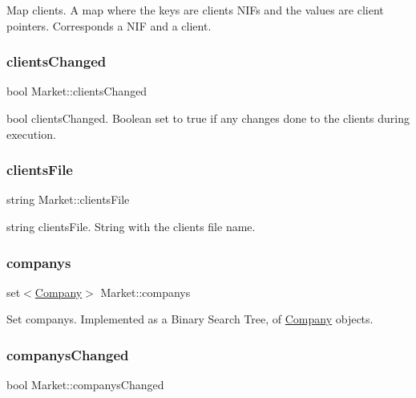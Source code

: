 Map clients. A map where the key\textquotesingle{}s are clients N\+IF\textquotesingle{}s and the values are client pointers. Corresponds a N\+IF and a client. \mbox{\label{class_market_a6028725209e63a9f70a6b59c10d2bfbb}} 
\subsubsection{\texorpdfstring{clients\+Changed}{clientsChanged}}
{\footnotesize\ttfamily bool Market\+::clients\+Changed\hspace{0.3cm}{\ttfamily [private]}}

bool clients\+Changed. Boolean set to true if any changes done to the clients during execution. \mbox{\label{class_market_aaf295ab39cf11a5af7e3decce4938b88}} 
\subsubsection{\texorpdfstring{clients\+File}{clientsFile}}
{\footnotesize\ttfamily string Market\+::clients\+File\hspace{0.3cm}{\ttfamily [private]}}

string clients\+File. String with the client\textquotesingle{}s file name. \mbox{\label{class_market_a66e915108e283c8fe899064868c2386d}} 
\subsubsection{\texorpdfstring{companys}{companys}}
{\footnotesize\ttfamily set$<$\hyperlink{class_company}{Company}$>$ Market\+::companys\hspace{0.3cm}{\ttfamily [private]}}

Set companys. Implemented as a Binary Search Tree, of \hyperlink{class_company}{Company} objects. \mbox{\label{class_market_a1c96ae6c45e556eb7fb6e52ec669d1e8}} 
\subsubsection{\texorpdfstring{companys\+Changed}{companysChanged}}
{\footnotesize\ttfamily bool Market\+::companys\+Changed\hspace{0.3cm}{\ttfamily [private]}}

